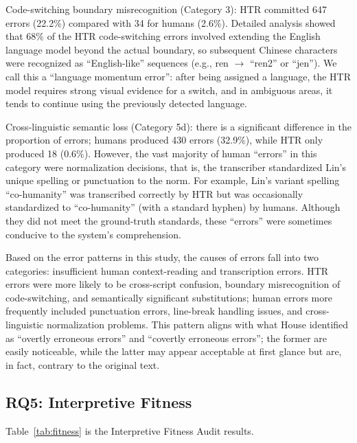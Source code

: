 \documentclass[final]{anthology-ch} %
\begin{document}
Code-switching boundary misrecognition (Category 3): HTR committed 647 errors (22.2\%) compared with 34 for humans (2.6\%). Detailed analysis showed that 68\% of the HTR code-switching errors involved extending the English language model beyond the actual boundary, so subsequent Chinese characters were recognized as \enquote{English-like} sequences (e.g., ren $\rightarrow$ \enquote{ren2} or \enquote{jen}). We call this a \enquote{language momentum error}: after being assigned a language, the HTR model requires strong visual evidence for a switch, and in ambiguous areas, it tends to continue using the previously detected language.

Cross-linguistic semantic loss (Category 5d): there is a significant difference in the proportion of errors; humans produced 430 errors (32.9\%), while HTR only produced 18 (0.6\%). However, the vast majority of human \enquote{errors} in this category were normalization decisions, that is, the transcriber standardized Lin's unique spelling or punctuation to the norm. For example, Lin's variant spelling \enquote{co-humanity} was transcribed correctly by HTR but was occasionally standardized to \enquote{co-humanity} (with a standard hyphen) by humans. Although they did not meet the ground-truth standards, these \enquote{errors} were sometimes conducive to the system's comprehension.

Based on the error patterns in this study, the causes of errors fall into two categories: insufficient human context-reading and transcription errors. HTR errors were more likely to be cross-script confusion, boundary misrecognition of code-switching, and semantically significant substitutions; human errors more frequently included punctuation errors, line-break handling issues, and cross-linguistic normalization problems. This pattern aligns with what House \cite{house1997translation, house2015translation} identified as \enquote{overtly erroneous errors} and \enquote{covertly erroneous errors}; the former are easily noticeable, while the latter may appear acceptable at first glance but are, in fact, contrary to the original text.

\subsection{RQ5: Interpretive Fitness}

Table~\ref{tab:fitness} is the Interpretive Fitness Audit results.
\end{document}
